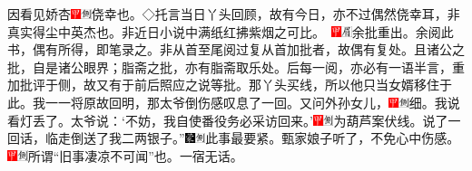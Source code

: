 因看见娇杏{\includegraphics[width=3mm]{../Images/00002}\includegraphics[width=3mm]{../Images/00011}\footnotesize \kaishu 侥幸也。◇托言当日丫头回顾，故有今日，亦不过偶然侥幸耳，非真实得尘中英杰也。非近日小说中满纸红拂紫烟之可比。　\includegraphics[width=3mm]{../Images/00002}\includegraphics[width=3mm]{../Images/00010}\footnotesize \kaishu 余批重出。余阅此书，偶有所得，即笔录之。非从首至尾阅过复从首加批者，故偶有复处。且诸公之批，自是诸公眼界；脂斋之批，亦有脂斋取乐处。后每一阅，亦必有一语半言，重加批评于侧，故又有于前后照应之说等批。}那丫头买线，所以他只当女婿移住于此。我一一将原故回明，那太爷倒伤感叹息了一回。又问外孙女儿，{\includegraphics[width=3mm]{../Images/00002}\includegraphics[width=3mm]{../Images/00011}\footnotesize \kaishu 细。}我说看灯丢了。太爷说：`不妨，我自使番役务必采访回来。'{\includegraphics[width=3mm]{../Images/00002}\includegraphics[width=3mm]{../Images/00011}\footnotesize \kaishu 为葫芦案伏线。}说了一回话，临走倒送了我二两银子。''{\includegraphics[width=3mm]{../Images/00006}\includegraphics[width=3mm]{../Images/00011}\footnotesize \kaishu 此事最要紧。}甄家娘子听了，不免心中伤感。{\includegraphics[width=3mm]{../Images/00002}\includegraphics[width=3mm]{../Images/00011}\footnotesize \kaishu 所谓``旧事凄凉不可闻''也。}一宿无话。

